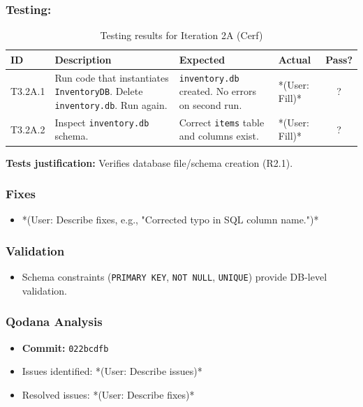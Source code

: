 \subsubsection{Testing:}
\begin{table}[htbp]
	\centering
	\begin{tabularx}{\textwidth}{|l|X|p{4.5cm}|p{1.5cm}|c|}
		\hline
		\textbf{ID} & \textbf{Description} & \textbf{Expected} & \textbf{Actual} & \textbf{Pass?} \\
		\hline
		T3.2A.1 & Run code that instantiates \verb|InventoryDB|. Delete \verb|inventory.db|. Run again. & \verb|inventory.db| created. No errors on second run. & *(User: Fill)* & ? \\
		\hline
		T3.2A.2 & Inspect \verb|inventory.db| schema. & Correct \verb|items| table and columns exist. & *(User: Fill)* & ? \\
		\hline
	\end{tabularx}
	\caption{Testing results for Iteration 2A (Cerf)}
\end{table}
\textbf{Tests justification:} Verifies database file/schema creation (R2.1).

\subsubsection{Fixes}
\begin{itemize}
	\item *(User: Describe fixes, e.g., "Corrected typo in SQL column name.")*
\end{itemize}

\subsubsection{Validation}
\begin{itemize}
	\item Schema constraints (\verb|PRIMARY KEY|, \verb|NOT NULL|, \verb|UNIQUE|) provide DB-level validation.
\end{itemize}

\subsubsection{Qodana Analysis}
\begin{itemize}
	\item \textbf{Commit:} \verb|022bcdfb|
	\item Issues identified: *(User: Describe issues)*
	\item Resolved issues: *(User: Describe fixes)*
\end{itemize}

